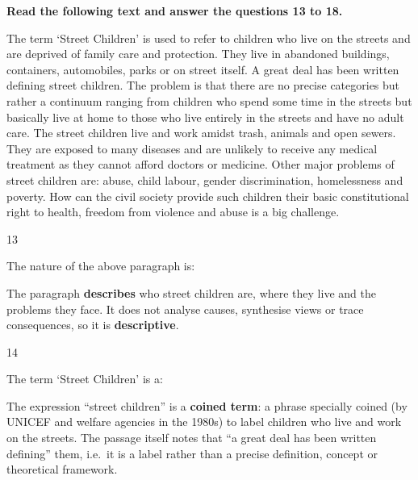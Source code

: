 \begin{context}
\textbf{Read the following text and answer the questions 13 to 18.}\par\smallskip
The term `Street Children' is used to refer to children who live on the streets and are deprived of family care and protection. They live in abandoned buildings, containers, automobiles, parks or on street itself. A great deal has been written defining street children. The problem is that there are no precise categories but rather a continuum ranging from children who spend some time in the streets but basically live at home to those who live entirely in the streets and have no adult care. The street children live and work amidst trash, animals and open sewers. They are exposed to many diseases and are unlikely to receive any medical treatment as they cannot afford doctors or medicine. Other major problems of street children are: abuse, child labour, gender discrimination, homelessness and poverty. How can the civil society provide such children their basic constitutional right to health, freedom from violence and abuse is a big challenge.
\end{context}
\begin{question}{13}
{The nature of the above paragraph is:\par}
\begin{explain}
The paragraph \textbf{describes} who street children are, where they live and the problems they face. It does not analyse causes, synthesise views or trace consequences, so it is \textbf{descriptive}.
\end{explain}
\end{question}

\begin{question}{14}
{The term `Street Children' is a:\par}
\begin{explain}
The expression ``street children'' is a \textbf{coined term}: a phrase specially coined (by UNICEF and welfare agencies in the 1980s) to label children who live and work on the streets. The passage itself notes that ``a great deal has been written defining'' them, i.e.\ it is a label rather than a precise definition, concept or theoretical framework.
\end{explain}
\end{question}

